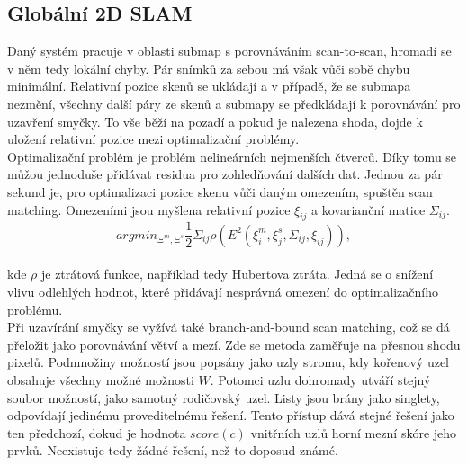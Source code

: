 \documentclass[12pt]{report}
\begin{document}
\subsection{Globální 2D SLAM}
Daný systém pracuje v oblasti submap s porovnáváním scan-to-scan, hromadí se v něm tedy lokální chyby. Pár snímků za sebou má však vůči sobě chybu minimální. Relativní pozice skenů se ukládají a v případě, že se submapa nezmění, všechny další páry ze skenů a submapy se předkládají k porovnávání pro uzavření smyčky. To vše běží na pozadí a pokud je nalezena shoda, dojde k uložení relativní pozice mezi optimalizační problémy.\\
\indent Optimalizační problém je problém nelineárních nejmenších čtverců. Díky tomu se můžou jednoduše přidávat residua pro zohledňování dalších dat. Jednou za pár sekund je, pro optimalizaci pozice skenu vůči daným omezením, spuštěn scan matching. Omezeními jsou myšlena relativní pozice $\xi_{ij}$ a kovarianční matice $\Sigma_{ij}$.
\begin{equation}
argmin_{\Xi^m,\Xi^s}\frac{1}{2}\Sigma_{ij}\rho(E^2(\xi_i^m,\xi_j^s,\Sigma_{ij},\xi_{ij})),
\end{equation}\\
kde $\rho$ je ztrátová funkce, například tedy Hubertova ztráta. Jedná se o snížení vlivu odlehlých hodnot, které přidávají nesprávná omezení do optimalizačního problému.\\
\indent Při uzavírání smyčky se vyžívá také branch-and-bound scan matching, což se dá přeložit jako porovnávání větví a mezí. Zde se metoda zaměřuje na přesnou shodu pixelů. Podmnožiny možností jsou popsány jako uzly stromu, kdy kořenový uzel obsahuje všechny možné možnosti $W$. Potomci uzlu dohromady utváří stejný soubor možností, jako samotný rodičovský uzel. Listy jsou brány jako singlety, odpovídají jedinému proveditelnému řešení. Tento přístup dává stejné řešení jako ten předchozí, dokud je hodnota $score(c)$ vnitřních uzlů horní mezní skóre jeho prvků. Neexistuje tedy žádné řešení, než to doposud známé.
\end{document}
